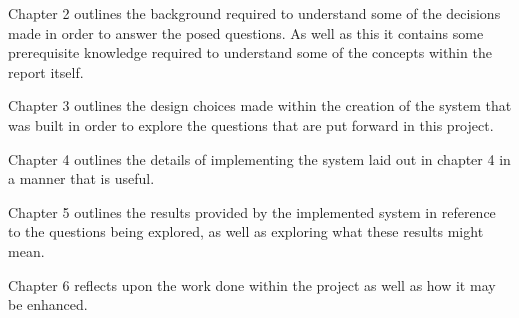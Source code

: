 Chapter 2 outlines the background required to understand some of the decisions made in order to answer the posed questions. As well as this it contains some prerequisite knowledge required to understand some of the concepts within the report itself.

Chapter 3 outlines the design choices made within the creation of the system that was built in order to explore the questions that are put forward in this project.

Chapter 4 outlines the details of implementing the system laid out in chapter 4 in a manner that is useful.

Chapter 5 outlines the results provided by the implemented system in reference to the questions being explored, as well as exploring what these results might mean.

Chapter 6 reflects upon the work done within the project as well as how it may be enhanced.